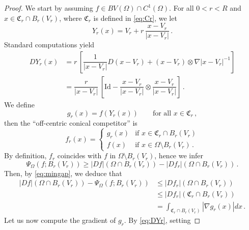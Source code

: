 \documentclass[a4paper,reqno,11pt]{amsart}
\newcommand{\C}{{\mathfrak C}}
\newcommand{\Id}{\mathrm{Id}} %
\newcommand{\ch}{\mathbf{1}}
\begin{document}
\begin{proof}
We start by assuming $f \in BV(\Omega) \cap C^{1}(\Omega)$. For all $0 < r < R$ and $x \in \C_{r} \cap B_{r}(V_{r})$, where $\C_{r}$ is defined in \eqref{eq:Cr}, we let
\begin{equation*}
Y_{r}(x) = V_r + r \, \dfrac{x - V_r}{|x - V_r|} \, .
\end{equation*}
Standard computations yield
\begin{align} \label{eq:DYr}
DY_{r}(x) & = r \, \left[ \dfrac{1}{|x - V_r|} D(x - V_r) + (x - V_r) \otimes \nabla |x - V_r|^{-1} \right] \\
& = \dfrac{r}{|x - V_r|} \, \left[ \Id - \dfrac{x - V_r}{|x - V_r|} \otimes \dfrac{x - V_r}{|x - V_r|} \right] \, . \nonumber
\end{align}
We define
\begin{equation*}
g_{r}(x) = f(Y_{r}(x))\qquad \text{for all $x \in \C_{r} \, ,$}
\end{equation*}
then the ``off-centric conical competitor'' is
\begin{equation*} %
f_{r}(x) = 
\begin{cases}
g_{r}(x) & \text{if $x \in \C_{r} \cap B_{r}(V_r)$} \\
f(x) & \text{if $x \in \Omega \setminus B_{r}(V_r) \, .$}
\end{cases}
\end{equation*}
		By definition, $f_{r}$ coincides with $f$ in $\Omega \setminus B_{r}(V_r)$, hence we infer
		\begin{equation} \label{eq:mingap}
			\Psi_{\Omega}(f;B_{r}(V_r)) \geq |Df|(\Omega \cap B_{r}(V_r)) - |Df_{r}|(\Omega \cap B_{r}(V_r)) \, .
		\end{equation}
		Then, by \eqref{eq:mingap}, we deduce that
		\begin{align} \label{eq:estcomp}
			|Df|(\Omega \cap B_{r}(V_r)) - \Psi_{\Omega}(f;B_{r}(V_r)) & \leq |Df_{r}|(\Omega \cap B_{r}(V_r)) \nonumber \\
			& \leq |Df_{r}|(\C_{r} \cap B_{r}(V_r)) \\
			& = \int_{\C_{r} \cap B_{r}(V_r)} |\nabla g_{r} (x)| dx \, . \nonumber
		\end{align}
		Let us now compute the gradient of $g_{r}$. By \eqref{eq:DYr}, setting

\end{proof}
\end{document}
